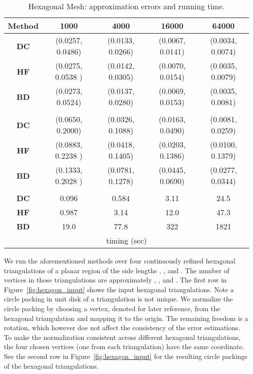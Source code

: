 \documentclass[11pt]{article}
\begin{document}
\begin{table}[!h]
\begin{center}
\begin{tabular}{| c | c | c | c | c |}
\hline
Method  & 1000 &  4000 & 16000 & 64000   \\
\hline
{\bf DC} & (0.0257, 0.0486) & (0.0133, 0.0266) & (0.0067, 0.0141) & (0.0034, 0.0074) \\
\hline
{\bf HF} & (0.0275, 0.0538 ) & (0.0142, 0.0305) & (0.0070, 0.0154) & (0.0035, 0.0079)\\
\hline
{\bf BD}& (0.0273, 0.0524) & (0.0137, 0.0280) & (0.0069, 0.0153) & (0.0035, 0.0081)\\
\hline
\multicolumn{5}{|c|}{ } \\
\hline
{\bf DC} & (0.0650, 0.2000) & (0.0326, 0.1088) & (0.0163, 0.0490) & (0.0081, 0.0259) \\
\hline
{\bf HF} & (0.0883, 0.2238 ) & (0.0418, 0.1405) & (0.0203, 0.1386) & (0.0100, 0.1379)\\
\hline
{\bf BD}& (0.1333, 0.2028 ) & (0.0781, 0.1278) & (0.0445, 0.0690) & (0.0277, 0.0344)\\
\hline
\multicolumn{5}{|c|}{ } \\
\hline
{\bf DC} & 0.096 & 0.584 & 3.11 & 24.5 \\
\hline
{\bf HF} &  0.987 & 3.14 & 12.0 & 47.3 \\
\hline
{\bf BD}& 19.0 & 77.8  & 322 & 1821\\
\hline
\multicolumn{5}{|c|}{ timing (sec)} \\
\hline
\end{tabular}
\end{center}
\vspace{-0.1in}
\caption{Hexagonal Mesh: approximation errors and running time.
\label{tbl:hexagon}
}
\end{table}


We run the aforementioned methods over four continuously refined hexagonal triangulations of a planar region
of the side lengths , ,  and . The number of vertices in those triangulations are approximately
, ,  and . The first row in Figure~\ref{fig:hexagon_input} shows the input hexagonal triangulations. 
Note a circle packing in unit disk of a triangulation is not unique. We normalize the circle 
packing by choosing a vertex, denoted  for later reference, from the hexagonal triangulation and mapping it to the origin.
The remaining freedom is a rotation, which however doe not affect the consistency of the error estimations.
To make the normalization consistent across different hexagonal triangulations, the four chosen vertices  
(one from each triangulation) have the same coordinate. See the second row in Figure~\ref{fig:hexagon_input} for the
resulting circle packings of the hexagonal triangulations. 
\end{document}
